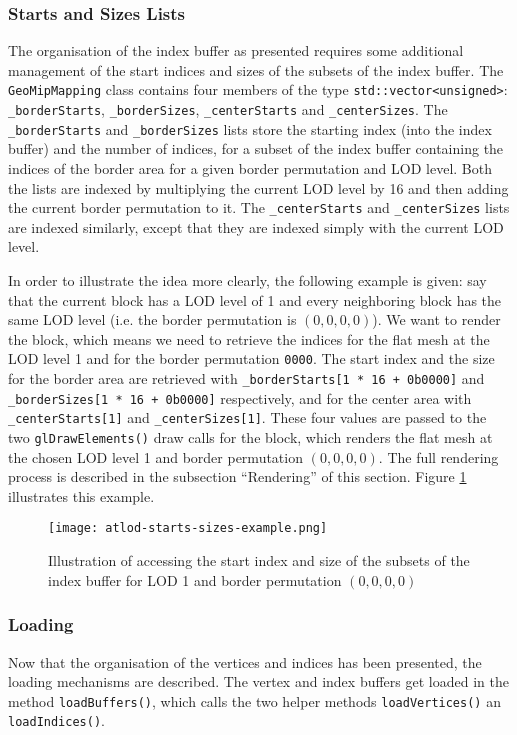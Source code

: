 \subsubsection{Starts and Sizes Lists}
The organisation of the index buffer as presented requires some additional
management of the start indices and sizes of the subsets of the index buffer. The \texttt{GeoMipMapping} class 
contains four members of the type \texttt{std::vector<unsigned>}:
\texttt{\_borderStarts}, \texttt{\_borderSizes}, \texttt{\_centerStarts} and \texttt{\_centerSizes}.
The \texttt{\_borderStarts} and \texttt{\_borderSizes} lists store the starting index 
(into the index buffer) and 
the number of indices, for a subset of the index buffer containing the indices of the border area for a given border permutation and LOD level.
Both the lists are indexed by multiplying the current LOD level by 16 
and then adding the current border permutation to it.
The \texttt{\_centerStarts} and \texttt{\_centerSizes} lists are indexed similarly,
except that they are indexed simply with the current LOD level.

In order to illustrate the idea more clearly, the following example is given:
say that the current block has a LOD level of 1 and every neighboring block has the 
same LOD level (i.e. the border permutation is $(0,0,0,0)$). 
We want to render the block, which means 
we need to retrieve the indices for the flat mesh 
at the LOD level 1 and for the border permutation \texttt{0000}.
The start index and the size for the border area are retrieved with \texttt{\_borderStarts[1 * 16 + 0b0000]}
and \texttt{\_borderSizes[1 * 16 + 0b0000]} respectively, and for 
the center area with \texttt{\_centerStarts[1]} and \texttt{\_centerSizes[1]}.
These four values are passed to the two \texttt{glDrawElements()} draw calls for the block,
which renders the flat mesh at the chosen LOD level 1 and border permutation $(0,0,0,0)$.
The full rendering process is described in the subsection ``Rendering'' of this section.
Figure \ref{fig:atlod-starts-sizes-example} illustrates this example.

\begin{figure}[H]
  \centering
  \texttt{[image: atlod-starts-sizes-example.png]}
  \caption{Illustration of accessing the start index and size of the subsets of the index buffer for LOD 1 and border permutation $(0,0,0,0)$}\label{fig:atlod-starts-sizes-example}
\end{figure}

\subsubsection{Loading}
Now that the organisation of the vertices and indices 
has been presented, the loading mechanisms are described.
The vertex and index buffers get loaded in the method \texttt{loadBuffers()},
which calls the two helper methods \texttt{loadVertices()} an \texttt{loadIndices()}.

